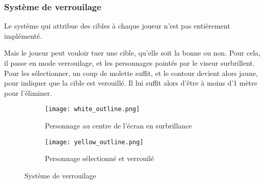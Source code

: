         
        \subsubsection{Système de verrouilage}

            Le système qui attribue des cibles à chaque joueur n'est pas entièrement implémenté.
            
            Mais le joueur peut vouloir tuer une cible, qu'elle soit la bonne ou non.
            Pour cela, il passe en mode verrouilage, et les personnages pointés par le viseur surbrillent.
            Pour les sélectionner, un coup de molette suffit, et le contour devient alors jaune, pour indiquer que la cible est verouillé.
            Il lui suffit alors d'être à moins d'1 mètre pour l'éliminer.

            \begin{figure}[hbt!]
                \centering
                \begin{subfigure}[b]{0.3\textwidth}
                    \texttt{[image: white\_outline.png]} 
                    \caption{Personnage au centre de l'écran en surbrillance}
                \end{subfigure}
                \hspace{150pt}
                \begin{subfigure}[b]{0.3\textwidth}
                    \texttt{[image: yellow\_outline.png]} 
                    \caption{Personnage sélectionné et verrouilé}
                \end{subfigure}
                \caption{Système de verrouilage}
            \end{figure}